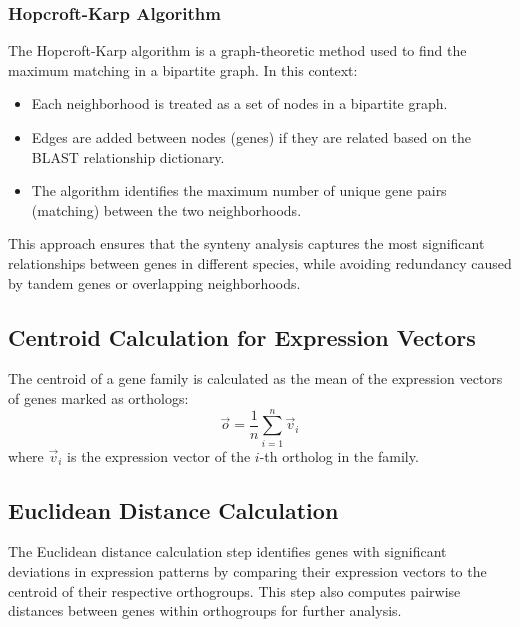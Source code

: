 \documentclass{article}
\begin{document}
\subsubsection{Hopcroft-Karp Algorithm}
The Hopcroft-Karp algorithm is a graph-theoretic method used to find the maximum matching in a bipartite graph. In this context:
\begin{itemize}
    \item Each neighborhood is treated as a set of nodes in a bipartite graph.
    \item Edges are added between nodes (genes) if they are related based on the BLAST relationship dictionary.
    \item The algorithm identifies the maximum number of unique gene pairs (matching) between the two neighborhoods.
\end{itemize}

This approach ensures that the synteny analysis captures the most significant relationships between genes in different species, while avoiding redundancy caused by tandem genes or overlapping neighborhoods.

\subsection{Centroid Calculation for Expression Vectors}
The centroid of a gene family is calculated as the mean of the expression vectors of genes marked as orthologs:
\[
\vec{o} = \frac{1}{n} \sum_{i=1}^n \vec{v}_i
\]
where \( \vec{v}_i \) is the expression vector of the \( i \)-th ortholog in the family.

\subsection{Euclidean Distance Calculation}
The Euclidean distance calculation step identifies genes with significant deviations in expression patterns by comparing their expression vectors to the centroid of their respective orthogroups. This step also computes pairwise distances between genes within orthogroups for further analysis.
\end{document}
